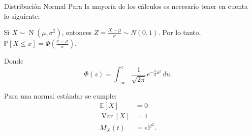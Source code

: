 \documentclass[a4paper]{article}
\theoremstyle{mytheoremstyle}
\newcommand{\IP}{\mathbb{P}}
\newcommand{\E}{\mathbb{E}}
\newcommand{\1}{\mathds{1}}
\DeclareMathOperator{\Var}{Var}
\DeclareMathOperator{\dnormal}{N}
\begin{document}
\begin{multicols*}{3}
\begin{roundbox}{Distribución Normal}
    Para la mayoría de los cálculos es necesario tener en cuenta lo siguiente: 

    Si $X \sim \dnormal(\mu, \sigma^2)$, entonces $Z = \frac{X-\mu}{\sigma} \sim N(0,1)$.
    Por lo tanto, $\IP[X\leq x] =  \Phi\left( \frac{x-\mu}{\sigma} \right)$. 

    Donde
    \[
        \Phi(z) = \int_{-\infty}^{z} \frac{1}{\sqrt{2 \pi}} e^{-\frac{1}{2} u^2} \, du.
    \]

    Para una normal estándar se cumple: 
    \begin{align*}
        \E[X] &= 0 \\
        \Var[X] &= 1 \\
        M_X(t) &= e^{\frac{1}{2} t^2}.
    \end{align*}
\end{roundbox}

\end{multicols*}
\end{document}
